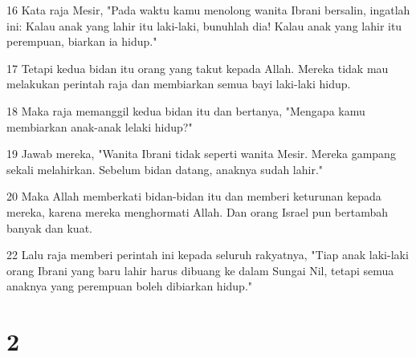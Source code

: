 \par 16 Kata raja Mesir, "Pada waktu kamu menolong wanita Ibrani bersalin, ingatlah ini: Kalau anak yang lahir itu laki-laki, bunuhlah dia! Kalau anak yang lahir itu perempuan, biarkan ia hidup."
\par 17 Tetapi kedua bidan itu orang yang takut kepada Allah. Mereka tidak mau melakukan perintah raja dan membiarkan semua bayi laki-laki hidup.
\par 18 Maka raja memanggil kedua bidan itu dan bertanya, "Mengapa kamu membiarkan anak-anak lelaki hidup?"
\par 19 Jawab mereka, "Wanita Ibrani tidak seperti wanita Mesir. Mereka gampang sekali melahirkan. Sebelum bidan datang, anaknya sudah lahir."
\par 20 Maka Allah memberkati bidan-bidan itu dan memberi keturunan kepada mereka, karena mereka menghormati Allah. Dan orang Israel pun bertambah banyak dan kuat.
\par 22 Lalu raja memberi perintah ini kepada seluruh rakyatnya, "Tiap anak laki-laki orang Ibrani yang baru lahir harus dibuang ke dalam Sungai Nil, tetapi semua anaknya yang perempuan boleh dibiarkan hidup."

\chapter{2}


